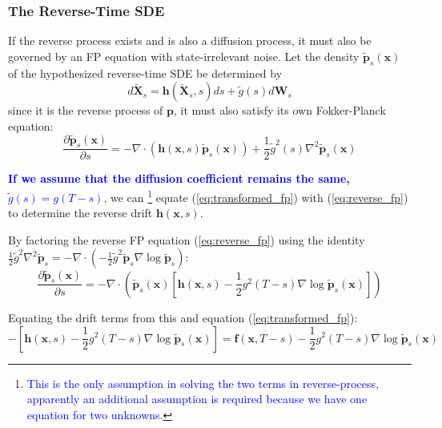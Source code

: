 \documentclass{article}
\begin{document}
\subsubsection{The Reverse-Time SDE}
If the reverse process exists and is also a diffusion process, it must also be governed by an FP equation with state-irrelevant noise. Let the density $\tilde{\mathbf{p}}_s(\mathbf{x})$ of the hypothesized reverse-time SDE be determined by
\begin{equation}
    d\tilde{\mathbf{X}}_s = \mathbf{h}(\tilde{\mathbf{X}}_s, s) ds + \tilde{g}(s) d\mathbf{W}_s
    \label{eq:reverse_sde_hypo}
\end{equation}
since it is the reverse process of $\mathbf{p}$, it must also satisfy its own Fokker-Planck equation:
%
\begin{equation}
    \frac{\partial \tilde{\mathbf{p}}_s(\mathbf{x})}{\partial s} = -\nabla \cdot \left(\mathbf{h}(\mathbf{x}, s) \tilde{\mathbf{p}}_s(\mathbf{x})\right) + \frac{1}{2} \tilde{g}^2(s) \nabla^2 \tilde{\mathbf{p}}_s(\mathbf{x})
    \label{eq:reverse_fp}
\end{equation}

\textbf{\textcolor{blue}{If we assume that the diffusion coefficient remains the same, $\tilde{g}(s) = g(T-s)$}}, we can \footnote{\textcolor{blue}{This is the only assumption in solving the two terms in reverse-process, apparently an additional assumption is required because we have one equation for two unknowns.}} equate (\ref{eq:transformed_fp}) with (\ref{eq:reverse_fp}) to determine the reverse drift $\mathbf{h}(\mathbf{x}, s)$.

By factoring the reverse FP equation (\ref{eq:reverse_fp}) using the identity $\frac{1}{2} \tilde{g}^2 \nabla^2 \tilde{\mathbf{p}}_s = -\nabla \cdot \left(-\frac{1}{2} \tilde{g}^2 \tilde{\mathbf{p}}_s \nabla \log \tilde{\mathbf{p}}_s\right)$:
%
\begin{equation}
    \frac{\partial \tilde{\mathbf{p}}_s(\mathbf{x})}{\partial s} = -\nabla \cdot \left(\tilde{\mathbf{p}}_s(\mathbf{x}) \left[\mathbf{h}(\mathbf{x}, s)-\frac{1}{2} g^2(T-s) \nabla \log \tilde{\mathbf{p}}_s(\mathbf{x})\right]\right)
\end{equation}

Equating the drift terms from this and equation (\ref{eq:transformed_fp}):
%
\begin{equation*}
    -\left[\mathbf{h}(\mathbf{x}, s) - \frac{1}{2} g^2(T-s) \nabla \log \tilde{\mathbf{p}}_s(\mathbf{x})\right] = \mathbf{f}(\mathbf{x}, T-s) - \frac{1}{2} g^2(T-s) \nabla \log \tilde{\mathbf{p}}_s(\mathbf{x})
\end{equation*}
\end{document}
